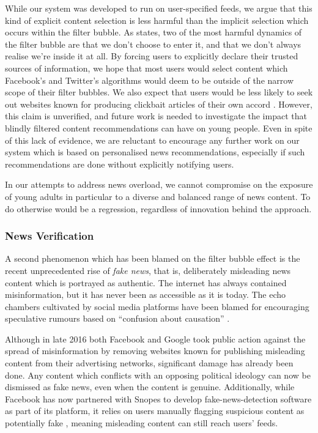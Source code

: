 While our system was developed to run on user-specified feeds, we argue that this kind of explicit content selection is less harmful than the implicit selection which occurs within the filter bubble. As \citeauthor{TheFilterBubble} states, two of the most harmful dynamics of the filter bubble are that we don't choose to enter it, and that we don't always realise we're inside it at all. 
By forcing users to explicitly declare their trusted sources of information, we hope that most users would select content which Facebook's and Twitter's algorithms would deem to be outside of the narrow scope of their filter bubbles. We also expect that users would be less likely to  seek out websites known for producing clickbait articles of their own accord \citep{clickbait}. However, this claim is unverified, and future work is needed to investigate the impact that blindly filtered content recommendations can have on young people. Even in spite of this lack of evidence, we are reluctant to encourage any further work on our system which is based on personalised news recommendations, especially if such recommendations are done without explicitly notifying users. 

In our attempts to address news overload, we cannot compromise on the exposure of young adults in particular to a diverse and balanced range of news content. To do otherwise would be a regression, regardless of innovation behind the approach.

\subsubsection{News Verification}

A second phenomenon which has been blamed on the filter bubble effect is the recent unprecedented rise of \textit{fake news}, that is, deliberately misleading news content which is portrayed as authentic. The internet has always contained misinformation, but it has never been as accessible as it is today. The echo chambers cultivated by social media platforms have been blamed for encouraging speculative rumours based on ``confusion about causation'' \citep[p.1]{TheSpreadingOfMisinformationOnline}.

Although in late 2016 both Facebook and Google took public action against the spread of misinformation by removing websites known for publishing misleading content from their advertising networks, significant damage has already been done. Any content which conflicts with an opposing political ideology can now be dismissed as fake news, even when the content is genuine. Additionally, while Facebook has now partnered with Snopes to develop fake-news-detection software as part of its platform, it relies on users manually flagging suspicious content as potentially fake \citep{FilterBubblesAndFakeNews}, meaning misleading content can still reach users' feeds.

